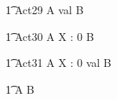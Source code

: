 
\begin{circusaction}
    	\t1 Act29 \circdef A   \upto val \rcirctime \circstartby B \\
\end{circusaction}

\begin{circusaction}
    	\t1 Act30 \circdef A  \lcirctime X : 0  \rcirctime \circstartby B \\
\end{circusaction}

\begin{circusaction}
    	\t1 Act31 \circdef A  \lcirctime X : 0 \upto val \rcirctime \circstartby B \\
\end{circusaction}
        
\begin{circusaction}        
        \t1 \circspot A \circseq B\\
\end{circusaction}

\begin{circus}    
\circend
\end{circus}
